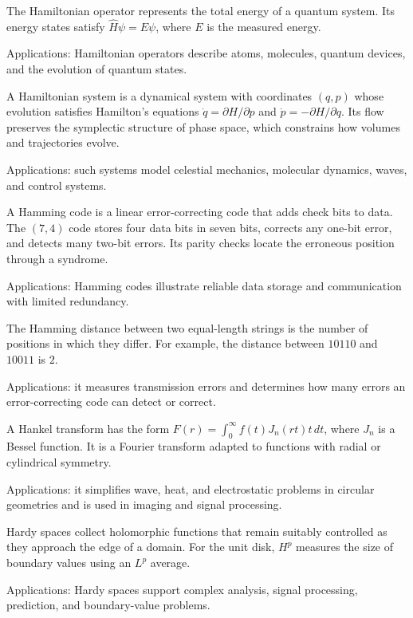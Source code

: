 The Hamiltonian operator represents the total energy of a quantum system. Its energy states satisfy $\hat H\psi=E\psi$, where $E$ is the measured energy. \par\noindent Applications: Hamiltonian operators describe atoms, molecules, quantum devices, and the evolution of quantum states.

A Hamiltonian system is a dynamical system with coordinates $(q,p)$ whose evolution satisfies Hamilton's equations $\dot q=\partial H/\partial p$ and $\dot p=-\partial H/\partial q$. Its flow preserves the symplectic structure of phase space, which constrains how volumes and trajectories evolve. \par\noindent Applications: such systems model celestial mechanics, molecular dynamics, waves, and control systems.

A Hamming code is a linear error-correcting code that adds check bits to data. The $(7,4)$ code stores four data bits in seven bits, corrects any one-bit error, and detects many two-bit errors. Its parity checks locate the erroneous position through a syndrome. \par\noindent Applications: Hamming codes illustrate reliable data storage and communication with limited redundancy.

The Hamming distance between two equal-length strings is the number of positions in which they differ. For example, the distance between $10110$ and $10011$ is $2$. \par\noindent Applications: it measures transmission errors and determines how many errors an error-correcting code can detect or correct.

A Hankel transform has the form $F(r)=\int_0^\infty f(t)J_n(rt)t\,dt$, where $J_n$ is a Bessel function. It is a Fourier transform adapted to functions with radial or cylindrical symmetry. \par\noindent Applications: it simplifies wave, heat, and electrostatic problems in circular geometries and is used in imaging and signal processing.

Hardy spaces collect holomorphic functions that remain suitably controlled as they approach the edge of a domain. For the unit disk, $H^p$ measures the size of boundary values using an $L^p$ average. \par\noindent Applications: Hardy spaces support complex analysis, signal processing, prediction, and boundary-value problems.

